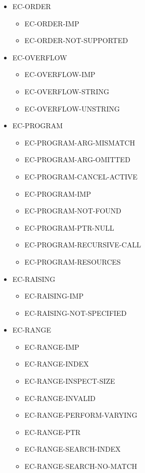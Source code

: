 \begin{itemize}
\item EC-ORDER
  \begin{itemize}
  \item EC-ORDER-IMP
  \item EC-ORDER-NOT-SUPPORTED
  \end{itemize}

\item EC-OVERFLOW
  \begin{itemize}
  \item EC-OVERFLOW-IMP
  \item EC-OVERFLOW-STRING
  \item EC-OVERFLOW-UNSTRING
  \end{itemize}

\item EC-PROGRAM
  \begin{itemize}
  \item EC-PROGRAM-ARG-MISMATCH
  \item EC-PROGRAM-ARG-OMITTED
  \item EC-PROGRAM-CANCEL-ACTIVE
  \item EC-PROGRAM-IMP
  \item EC-PROGRAM-NOT-FOUND
  \item EC-PROGRAM-PTR-NULL
  \item EC-PROGRAM-RECURSIVE-CALL
  \item EC-PROGRAM-RESOURCES
  \end{itemize}

\item EC-RAISING
  \begin{itemize}
  \item EC-RAISING-IMP
  \item EC-RAISING-NOT-SPECIFIED
  \end{itemize}

\item EC-RANGE
  \begin{itemize}
  \item EC-RANGE-IMP
  \item EC-RANGE-INDEX
  \item EC-RANGE-INSPECT-SIZE
  \item EC-RANGE-INVALID
  \item EC-RANGE-PERFORM-VARYING
  \item EC-RANGE-PTR
  \item EC-RANGE-SEARCH-INDEX
  \item EC-RANGE-SEARCH-NO-MATCH
  \end{itemize}


\end{itemize}
